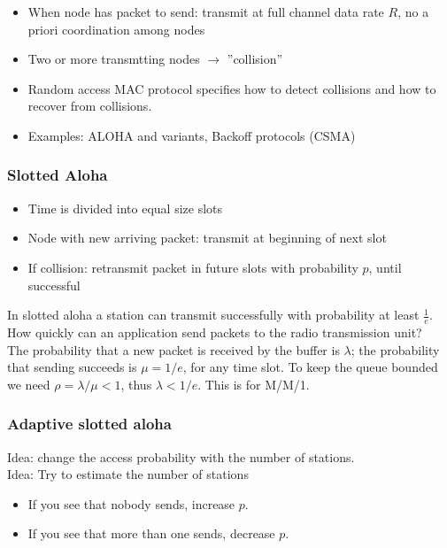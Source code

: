 \documentclass[10pt, a4paper, twocolumn]{scrartcl}
\begin{document}
\begin{itemize}
	\item When node has packet to send: transmit at full channel data rate $R$, no a priori coordination among nodes
	\item Two or more transmtting nodes $\rightarrow$ ''collision''
	\item Random access MAC protocol specifies how to detect collisions and how to recover from collisions.
	\item Examples: ALOHA and variants, Backoff protocols (CSMA)
\end{itemize}

\subsubsection{Slotted Aloha}

\begin{itemize}
	\item Time is divided into equal size slots
	\item Node with new arriving packet: transmit at beginning of next slot
	\item If collision: retransmit packet in future slots with probability $p$, until successful
\end{itemize}

In slotted aloha a station can transmit successfully with probability at least $\frac{1}{e}$.\\

How quickly can an application send packets to the radio transmission unit?\\
The probability that a new packet is received by the buffer is $\lambda$; the probability that sending succeeds is $\mu = 1/e$, for any time slot. To keep the queue bounded we need $\rho = \lambda / \mu < 1$, thus $\lambda < 1/e$. This is for M/M/1.

\subsubsection{Adaptive slotted aloha}

Idea: change the access probability with the number of stations.\\

Idea: Try to estimate the number of stations
\begin{itemize}
	\item If you see that nobody sends, increase $p$.
	\item If you see that more than one sends, decrease $p$.
\end{itemize}
\end{document}
